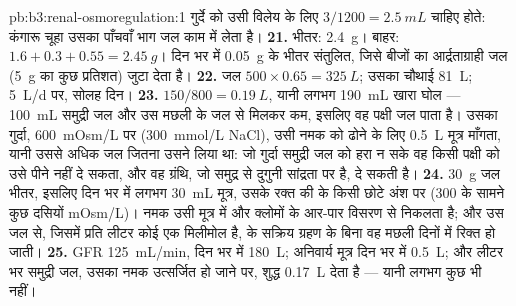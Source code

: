 \begin{solution}{pb:b3:renal-osmoregulation:1}
गुर्दे को उसी विलेय के लिए $3/1200 = \qty{2.5}{mL}$ चाहिए होते: कंगारू
चूहा उसका पाँचवाँ भाग जल काम में लेता है।
\textbf{21.} भीतर: \qty{2.4}{g}। बाहर: $1.6 + 0.3 + 0.55 = \qty{2.45}{g}$।
दिन भर में \qty{0.05}{g} के भीतर संतुलित, जिसे बीजों का आर्द्रताग्राही
जल (\qty{5}{g} का कुछ प्रतिशत) जुटा देता है।
\textbf{22.} जल $500\times 0.65 = \qty{325}{L}$; उसका चौथाई
\qty{81}{L}; \qty{5}{L/d} पर, सोलह दिन।
\textbf{23.} $150/800 = \qty{0.19}{L}$, यानी लगभग \qty{190}{mL} खारा
घोल --- \qty{100}{mL} समुद्री जल और उस मछली के जल से मिलकर कम, इसलिए वह
पक्षी जल पाता है। उसका गुर्दा, \qty{600}{mOsm/L} पर
(\qty{300}{mmol/L} NaCl), उसी नमक को ढोने के लिए \qty{0.5}{L} मूत्र
माँगता, यानी उससे अधिक जल जितना उसने लिया था: जो गुर्दा समुद्री जल को
हरा न सके वह किसी पक्षी को उसे पीने नहीं दे सकता, और वह ग्रंथि, जो
समुद्र से दुगुनी सांद्रता पर है, दे सकती है।
\textbf{24.} \qty{30}{g} जल भीतर, इसलिए दिन भर में लगभग \qty{30}{mL}
मूत्र, उसके रक्त की  के किसी छोटे अंश पर (\num{300} के सामने
कुछ दसियों mOsm/L)। नमक उसी मूत्र में और क्लोमों के आर-पार विसरण से
निकलता है; और उस जल से, जिसमें प्रति लीटर कोई एक मिलीमोल है,  के सक्रिय ग्रहण के बिना वह मछली दिनों में रिक्त हो जाती।
\textbf{25.} GFR \qty{125}{mL/min}, दिन भर में \qty{180}{L}; अनिवार्य
मूत्र दिन भर में \qty{0.5}{L}; और लीटर भर समुद्री जल, उसका नमक
उत्सर्जित हो जाने पर, शुद्ध \qty{0.17}{L} देता है --- यानी लगभग कुछ भी
नहीं।
\end{solution}
